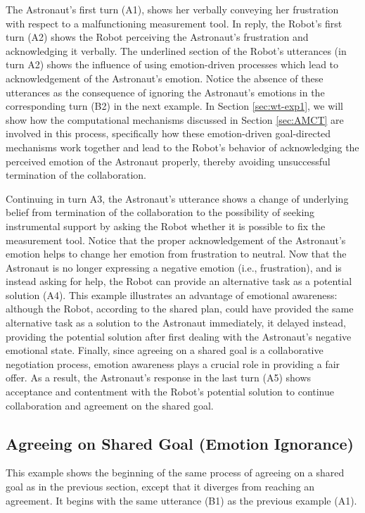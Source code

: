 The Astronaut's first turn (A1), shows her verbally conveying her frustration
with respect to a malfunctioning measurement tool. In reply, the Robot's first
turn (A2) shows the Robot perceiving the Astronaut's frustration and
acknowledging it verbally. The underlined section of the Robot's utterances (in
turn A2) shows the influence of using emotion-driven processes which lead to
acknowledgement of the Astronaut's emotion. Notice the absence of these
utterances as the consequence of ignoring the Astronaut's emotions in the
corresponding turn (B2) in the next example. In Section \ref{sec:wt-exp1}, we
will show how the computational mechanisms discussed in Section \ref{sec:AMCT}
are involved in this process, specifically how these emotion-driven
goal-directed mechanisms work together and lead to the Robot's behavior of
acknowledging the perceived emotion of the Astronaut properly, thereby avoiding
unsuccessful termination of the collaboration.

Continuing in turn A3, the Astronaut's utterance shows a change of underlying
belief from termination of the collaboration to the possibility of seeking
instrumental support by asking the Robot whether it is possible to fix the
measurement tool. Notice that the proper acknowledgement of the Astronaut's
emotion helps to change her emotion from frustration to neutral. Now that the
Astronaut is no longer expressing a negative emotion (i.e., frustration), and is
instead asking for help, the Robot can provide an alternative task as a
potential solution (A4). This example illustrates an advantage of
emotional awareness: although the Robot, according to the shared plan, could
have provided the same alternative task as a solution to the Astronaut
immediately, it delayed instead, providing the potential solution after first
dealing with the Astronaut's negative emotional state. Finally, since agreeing
on a shared goal is a collaborative negotiation process, emotion awareness plays
a crucial role in providing a fair offer. As a result, the Astronaut's response
in the last turn (A5) shows acceptance and contentment with the Robot's
potential solution to continue collaboration and agreement on the shared goal.

\subsection{Agreeing on Shared Goal (Emotion Ignorance)}
\label{sec:exp2}

This example shows the beginning of the same process of agreeing on a shared
goal as in the previous section, except that it diverges from reaching an
agreement. It begins with the same utterance (B1) as the previous example (A1).

